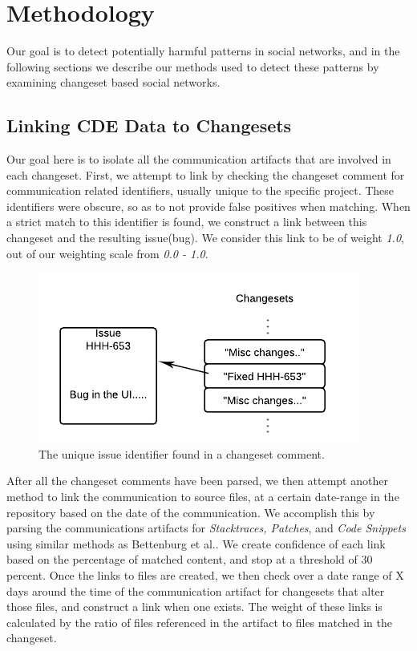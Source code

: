 \documentclass[conference]{IEEEtran}
\begin{document}
\section{Methodology}
Our goal is to detect potentially harmful patterns in social networks, and in the following sections we describe our methods used to detect these patterns by examining changeset based social networks.

\subsection{Linking CDE Data to Changesets}
Our goal here is to isolate all the communication artifacts that are involved in each changeset.  First, we attempt to link by checking the changeset comment for communication related identifiers, usually unique to the specific project.  These identifiers were obscure, so as to not provide false positives when matching.  When a strict match to this identifier is found, we construct a link between this changeset and the resulting issue(bug).  We consider this link to be of weight \textit{1.0}, out of our weighting scale from \textit{0.0 - 1.0}.  

\begin{figure}[h!]
\centering
\includegraphics[width=1.0\columnwidth]{CommitsToChangesets}
\caption{The unique issue identifier found in a changeset comment.\label{fig:identifier}}
\end{figure}

After all the changeset comments have been parsed, we then attempt another method to link the communication to source files, at a certain date-range in the repository based on the date of the communication.  We accomplish this by parsing the communications artifacts for \textit{Stacktraces, Patches}, and \textit{Code Snippets} using similar methods as Bettenburg et al.\cite{Bettenburg:2008:ESI:1370750.1370757}.  We create confidence of each link based on the percentage of matched content, and stop at a threshold of 30 percent.  Once the links to files are created, we then check over a date range of X days around the time of the communication artifact for changesets that alter those files, and construct a link when one exists.  The weight of these links is calculated by the ratio of files referenced in the artifact to files matched in the changeset.
\end{document}
